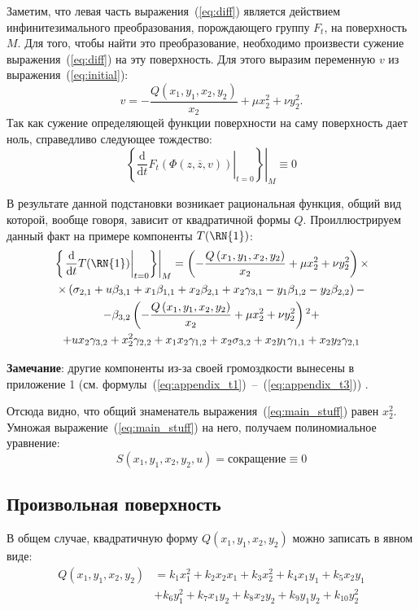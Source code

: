 \documentclass[../main.tex]{subfiles}
\begin{document}
Заметим, что левая часть выражения~(\ref{eq:diff}) является действием инфинитезимального преобразования, порождающего группу $F_t$, на поверхность $M$. Для того, чтобы найти это преобразование, необходимо произвести сужение выражения~(\ref{eq:diff}) на эту поверхность. Для этого выразим переменную $v$ из выражения~(\ref{eq:initial}):
\begin{equation*}
v = -\frac{Q(x_1, y_1, x_2, y_2)}{x_2} + \mu x_2^2 + \nu y_2^2.
\end{equation*}
Так как сужение определяющей функции поверхности на саму поверхность дает ноль, справедливо следующее тождество:
\begin{equation}\label{eq:main_stuff}
\left. \left\{\left.\frac{\mathrm d}{\mathrm{d}t} F_t\left(\Phi(z, \overline{z}, v)\right)\right|_{t = 0} \right\} \right|_M \equiv 0
\end{equation}

В результате данной подстановки возникает рациональная функция, общий вид которой, вообще говоря, зависит от квадратичной формы $Q$. Проиллюстрируем данный факт на примере компоненты $T(\mathrm{\RN{1}})$:
\begin{multline}
\left.\left\{ \left.\frac{\mathrm d}{\mathrm{d}t}T(\mathrm{\RN{1}})\right|_{t = 0}\right\} \right|_M =
\left(-\frac{Q\left(x_1,y_1,x_2,y_2\right)}{x_2} + \mu x_2^2 + \nu y_2^2\right) \times \\
\times \left( \sigma_{2,1} + u \beta_{3,1} + x_1 \beta_{1,1} + x_2 \beta_{2,1} + x_2 \gamma_{3,1} - y_1 \beta_{1,2} - y_2 \beta_{2,2} \right) - \\ 
- \beta_{3,2} \left(-\frac{Q\left(x_1,y_1,x_2,y_2\right)}{x_2}+\mu  x_2^2+\nu y_2^2\right){}^2 + \\
+ u x_2 \gamma_{3,2} + x_2^2 \gamma_{2,2} + x_1 x_2 \gamma_{1,2}+x_2 \sigma_{3,2}+x_2 y_1 \gamma_{1,1}+x_2 y_2 \gamma_{2,1}
\end{multline}

\textbf{Замечание}: другие компоненты из-за своей громоздкости вынесены в приложение 1 (см. формулы~(\ref{eq:appendix_t1})~--~(\ref{eq:appendix_t3})) .

Отсюда видно, что общий знаменатель выражения~(\ref{eq:main_stuff}) равен $x_2^2$. Умножая выражение~(\ref{eq:main_stuff}) на него, получаем полиномиальное уравнение:
\begin{equation*}
S(x_1, y_1, x_2, y_2, u) = \mathrm{сокращение} \equiv 0
\end{equation*}

\subsection{Произвольная поверхность}
В общем случае, квадратичную форму $Q(x_1, y_1, x_2, y_2)$ можно записать в явном виде: 
\begin{align*}
Q(x_1, y_1, x_2, y_2) &= k_1 x_1^2 + k_2 x_2 x_1 + k_3 x_2^2 + k_4 x_1 y_1 + k_5 x_2 y_1 \\
&+ k_6 y_1^2 + k_7 x_1 y_2 + k_8 x_2 y_2 + k_9 y_1 y_2 + k_{10} y_2^2
\end{align*}
\end{document}
